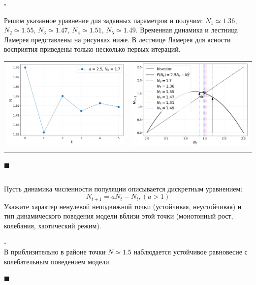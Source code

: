 \documentclass[a4paper]{article}
\newcommand{\solutionstart}{{\noindent $\square$ \\}}
\newcommand{\solutionend}{{\noindent $\blacksquare$ \\}}
\begin{document}
\solutionstart

Решим указанное уравнение для заданных параметров и получим: $N_1 \simeq 1.36$, $N_2 \simeq 1.55$, $N_3 \simeq 1.47$, $N_4 \simeq 1.51$, $N_5 \simeq 1.49$. Временная динамика и лестница Ламерея представлены на рисунках ниже. В лестнице Ламерея для ясности восприятия приведены только несколько первых итераций.

\begin{tabular}{p{8cm}p{8cm}}
\includegraphics[width=\linewidth]{N(t).png} &
\includegraphics[width=\linewidth]{stairs.png} \\
\centering{Временная динамика} & \centering{Лестница Ламерея}
\end{tabular}

\solutionend

\subsection{}
Пусть динамика численности популяции описывается дискретным уравнением:
\[
N_{t + 1} = a N_t - N_t, (a > 1)
\]
Укажите характер ненулевой неподвижной точки (устойчивая, неустойчивая) и тип динамического поведения модели вблизи этой точки (монотонный рост, колебания, хаотический режим).


\solutionstart
В приблизительно в районе точки $N \simeq 1.5$ наблюдается устойчивое равновесие с колебательным поведением модели.

\solutionend
\end{document}
